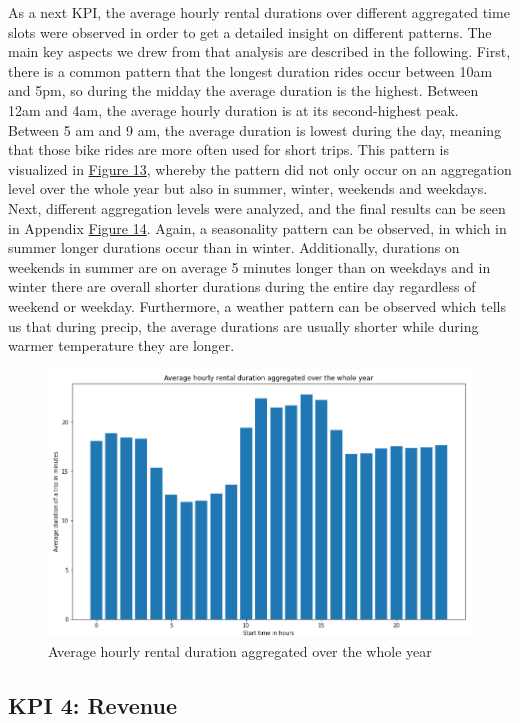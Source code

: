 As a next KPI, the average hourly rental durations over different aggregated time slots were observed in order to get a detailed insight on different patterns. The main key aspects we drew from that analysis are described in the following. First, there is a common pattern that the longest duration rides occur between 10am and 5pm, so during the midday the average duration is the highest. Between 12am and 4am, the average hourly duration is at its second-highest peak. Between 5 am and 9 am, the average duration is lowest during the day, meaning that those bike rides are more often used for short trips. This pattern is visualized in \hyperref[Duration_Fig_1]{Figure 13}, whereby the pattern did not only occur on an aggregation level over the whole year but also in summer, winter, weekends and weekdays. Next, different aggregation levels were analyzed, and the final results can be seen in Appendix \hyperref[Duration_Fig_2]{ Figure 14}. Again, a seasonality pattern can be observed, in which in summer longer durations occur than in winter. Additionally, durations on weekends in summer are on average 5 minutes longer than on weekdays and in winter there are overall shorter durations during the entire day regardless of weekend or weekday. Furthermore, a weather pattern can be observed which tells us that during precip, the average durations are usually shorter while during warmer temperature they are longer.

\begin{figure}[H]
   \centering
    \includegraphics[width=0.8\linewidth]{./Figures/Duration_Fig_1.png}
    \caption{Average hourly rental duration aggregated over the whole year}
    \label{Duration_Fig_1}
\end{figure}

\subsection{KPI 4: Revenue}
\label{subsec:KPI4}


